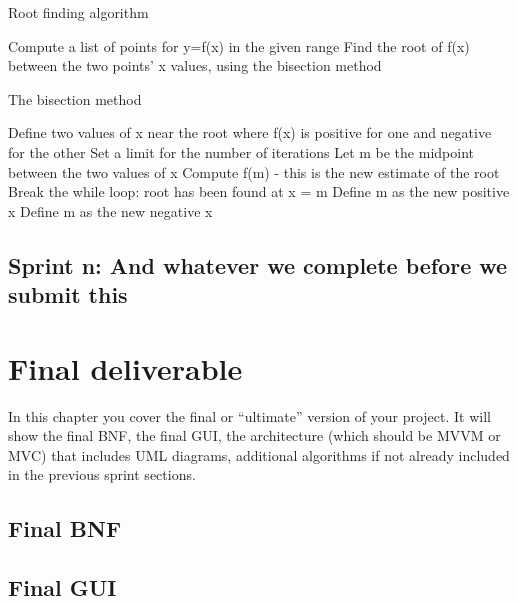 \documentclass[a4paper, oneside, 11pt]{report}
\begin{document}
\begin{algorithm}[th]
\caption{ Root finding algorithm }
\begin{algorithmic}[1]
\STATE Compute a list of points for y=f(x) in the given range
        \STATE Find the root of f(x) between the two points' x values, using the bisection method
    \ENDIF
\ENDFOR
\end{algorithmic}
\end{algorithm}

\begin{algorithm}[th]
\caption{ The bisection method }
\begin{algorithmic}[1]
\STATE Define two values of x near the root where f(x) is positive for one and negative for the other
\STATE Set a limit for the number of iterations
	\STATE Let m be the midpoint between the two values of x
    \STATE Compute f(m) - this is the new estimate of the root
        \STATE Break the while loop: root has been found at x = m
        \STATE Define m as the new positive x
        \STATE Define m as the new negative x
    \ENDIF
\ENDWHILE
\end{algorithmic}
\end{algorithm}

\section{Sprint n: And whatever we complete before we submit this}



\chapter{Final deliverable}\label{Impl}

In this chapter you cover the final or ``ultimate'' version of your project. It will show the final BNF, the final GUI, the architecture (which should be MVVM or MVC) that includes UML diagrams, additional algorithms if not already included in the previous sprint sections.

\section{Final BNF}

\section{Final GUI}
\end{document}
